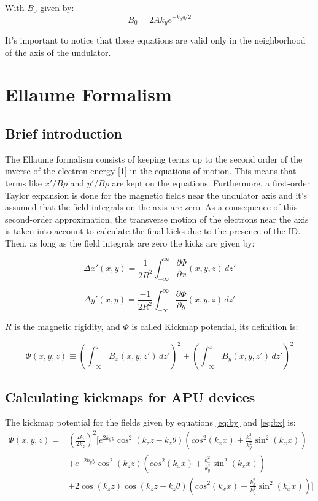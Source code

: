 \documentclass{article}
\begin{document}
With $B_0$ given by:
\begin{equation}
B_0 = 2Ak_ye^{-k_yg/2}
\end{equation}

It's important to notice that these equations are valid only in the neighborhood of the axis of the undulator.

\section{Ellaume Formalism}
\subsection{Brief introduction}
The Ellaume formalism consists of keeping terms up to the second order of the inverse of the electron energy [1] in the equations of motion. This means that terms like $x'/B\rho$ and $y'/B\rho$ are kept on the equations. Furthermore, a first-order Taylor expansion is done for the magnetic fields near the undulator axis and it's assumed that the field integrals on the axis are zero. As a consequence of this second-order approximation, the transverse motion of the electrons near the axis is taken into account to calculate the final kicks due to the presence of the ID. Then, as long as the field integrals are zero the kicks are given by:

\begin{equation}
\Delta x'(x,y) = \frac{1}{2R^2}\int_{-\infty}^{\infty} \frac{\partial \Phi}{\partial x}(x,y,z) \,dz'
\end{equation}

\begin{equation}
\Delta y'(x,y) = \frac{-1}{2R^2}\int_{-\infty}^{\infty} \frac{\partial \Phi}{\partial y}(x,y,z) \,dz'
\end{equation}

$R$ is the magnetic rigidity, and $\Phi$ is called Kickmap potential, its definition is:

\begin{equation}
\Phi(x,y,z) \equiv \left(\int_{-\infty}^{z} B_x(x,y,z') \,dz'\right)^2 + \left(\int_{-\infty}^{z} B_y(x,y,z') \,dz'\right)^2
\end{equation}

\subsection{Calculating kickmaps for APU devices}
 The kickmap potential for the fields given by equations \ref{eq:by} and \ref{eq:bx} is:
\begin{equation}
    \begin{split}
        \Phi(x,y,z) = & \left(\frac{B_0}{2k_z}\right)^2\bigg[e^{2k_yy}\cos^2(k_zz-k_z\theta)\left(cos^2(k_xx)+\frac{k_x^2}{k_y^2}\sin^2(k_xx)\right) \\
        & + e^{-2k_yy}\cos^2(k_zz)\left(cos^2(k_xx)+\frac{k_x^2}{k_y^2}\sin^2(k_xx)\right) \\
        & + 2\cos(k_zz)\cos(k_zz - k_z\theta)\left(cos^2(k_xx)-\frac{k_x^2}{k_y^2}\sin^2(k_xx)\right)\bigg]
    \end{split}
\end{equation}
\end{document}
